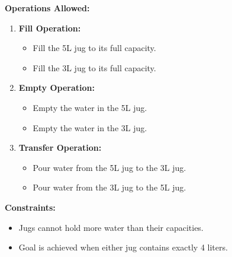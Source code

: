 \documentclass[12pt]{article}
\begin{document}
\textbf{Operations Allowed:}
\begin{enumerate}
    \item \textbf{Fill Operation:}
    \begin{itemize}
        \item Fill the 5L jug to its full capacity.
        \item Fill the 3L jug to its full capacity.
    \end{itemize}
    \item \textbf{Empty Operation:}
    \begin{itemize}
        \item Empty the water in the 5L jug.
        \item Empty the water in the 3L jug.
    \end{itemize}
    \item \textbf{Transfer Operation:}
    \begin{itemize}
        \item Pour water from the 5L jug to the 3L jug.
        \item Pour water from the 3L jug to the 5L jug.
    \end{itemize}
\end{enumerate}

\textbf{Constraints:}
\begin{itemize}
    \item Jugs cannot hold more water than their capacities.
    \item Goal is achieved when either jug contains exactly 4 liters.
\end{itemize}
\end{document}
